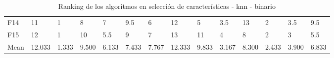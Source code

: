 \begin{table}
\begin{adjustbox}{width=\linewidth}
\begin{tabular}{llllllllllllll}
            F14  & 11     & 1     & 8     & 7     & 9.5   & 6     & 12     & 5     & 3.5   & 13    & 2     & 3.5   & 9.5   \\
            F15  & 12     & 1     & 10    & 5.5   & 9     & 7     & 13     & 11    & 4     & 8     & 2     & 3     & 5.5   \\
            Mean & 12.033 & 1.333 & 9.500 & 6.133 & 7.433 & 7.767 & 12.333 & 9.833 & 3.167 & 8.300 & 2.433 & 3.900 & 6.833 \\
            \bottomrule
        \end{tabular}
    \end{adjustbox}
    \caption{Ranking de los algoritmos en selección de características - knn - binario}
    \label{tab:ranking_sel_rate_bin_knn}
\end{table}


